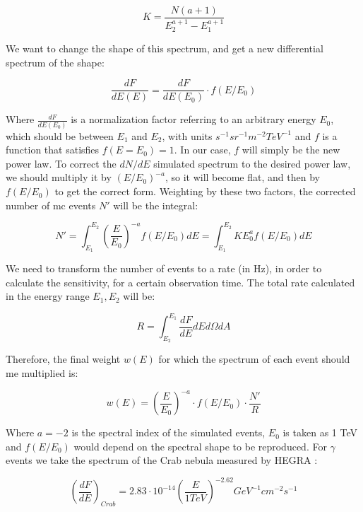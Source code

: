 \documentclass[main.tex]{subfiles}
\begin{document}
\begin{equation}
  K = \frac{N(a+1)}{E_{2}^{a+1}-E_{1}^{a+1}}
\end{equation}

We want to change the shape of this spectrum, and get a new differential spectrum of the shape:

\begin{equation}
  \frac{dF}{dE(E)} = \frac{dF}{dE(E_0)}\cdot f(E/E_0)
\end{equation}

Where $\frac{dF}{dE(E_0)}$ is a normalization factor referring to an arbitrary energy $E_0$, which should be between $E_{1}$ and $E_{2}$, with units $s^{-1}sr^{-1}m^{-2}TeV^{-1}$ and $f$ is a function that satisfies $f(E=E_{0}) = 1$. In our case, $f$ will simply be the new power law. To correct the $dN/dE$  simulated spectrum to the desired power law, we should multiply it by $(E/E_{0})^{-a}$, so it will become flat, and then by $f(E/E_{0})$ to get the correct form. Weighting by these two factors, the corrected number of \gls{mc} events $N'$ will be the integral:

\begin{equation}
  N' = \int^{E_{2}}_{E_{1}} \left(\frac{E}{E_{0}}\right)^{-a} f(E/E_{0}) dE = \int^{E_{2}}_{E_{1}} KE_{0}^{a}f(E/E_{0})dE
\end{equation}

We need to transform the number of events to a rate (in Hz), in order to calculate the sensitivity, for a certain observation time. The total rate calculated in the energy range $E_{1}, E_{2}$ will be:

\begin{equation}
  R = \int^{E_{1}}_{E_{2}} \frac{dF}{dE}dE d\Omega dA
\end{equation}

Therefore, the final weight $w(E)$ for which the spectrum of each event should me multiplied is:

\begin{equation}
  w(E) = \left(\frac{E}{E_0}\right)^{-a}\cdot f(E/E_{0}) \cdot \frac{N'}{R}
\end{equation}

Where $a=-2$ is the spectral index of the simulated events, $E_{0}$ is taken as 1 TeV and $f(E/E_{0})$ would depend on the spectral shape to be reproduced. For $\gamma$ events we take the spectrum of the Crab nebula measured by HEGRA \cite{2004CrabHEGRA}:

\begin{equation}
  \left(\frac{dF}{dE}\right)_{Crab} = 2.83\cdot 10^{-14} \left(\frac{E}{1 TeV}\right)^{-2.62} GeV^{-1}cm^{-2}s^{-1}
\end{equation}
\end{document}

